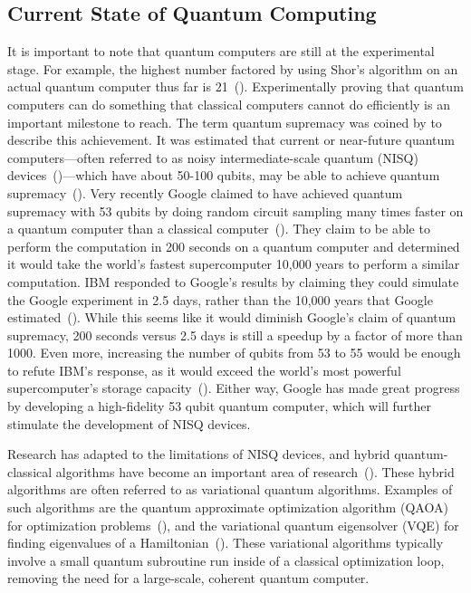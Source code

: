 \documentclass[a4paper,10pt]{article}
\begin{document}
\subsection{Current State of Quantum Computing}
It is important to note that quantum computers are still at the experimental stage.
For example, the highest number factored by using Shor's algorithm on an actual quantum computer thus far is 21~(\cite{shor-21}).
Experimentally proving that quantum computers can do something that classical computers cannot do efficiently is an important milestone to reach.
The term quantum supremacy was coined by \textcite{preskill-qc} to describe this achievement.
It was estimated that current or near-future quantum computers---often referred to as noisy intermediate-scale quantum (NISQ) devices~(\cite{preskill-nisq})---which have about 50-100 qubits, may be able to achieve quantum supremacy~(\cite{boixo2018characterizing}).
Very recently Google claimed to have achieved quantum supremacy with 53 qubits by doing random circuit sampling many times faster on a quantum computer than a classical computer~(\cite{arute2019quantum}).
They claim to be able to perform the computation in 200 seconds on a quantum computer and determined it would take the world's fastest supercomputer 10,000 years to perform a similar computation.
IBM responded to Google's results by claiming they could simulate the Google experiment in 2.5 days, rather than the 10,000 years that Google estimated~(\cite{pednault2019leveraging}).
While this seems like it would diminish Google's claim of quantum supremacy, 200 seconds versus 2.5 days is still a speedup by a factor of more than 1000.
Even more, increasing the number of qubits from 53 to 55 would be enough to refute IBM's response, as it would exceed the world's most powerful supercomputer's storage capacity~(\cite{aaronson2019supremacy}).
Either way, Google has made great progress by developing a high-fidelity 53 qubit quantum computer, which will further stimulate the development of NISQ devices.

Research has adapted to the limitations of NISQ devices, and hybrid quantum-classical algorithms have become an important area of research~(\cite{mcclean2016theory, guerreschi2017practical}).
These hybrid algorithms are often referred to as variational quantum algorithms.
Examples of such algorithms are the quantum approximate optimization algorithm (QAOA) for optimization problems~(\cite{qaoa}), and the variational quantum eigensolver (VQE) for finding eigenvalues of a Hamiltonian~(\cite{vqe}).
These variational algorithms typically involve a small quantum subroutine run inside of a classical optimization loop, removing the need for a large-scale, coherent quantum computer.
\end{document}
